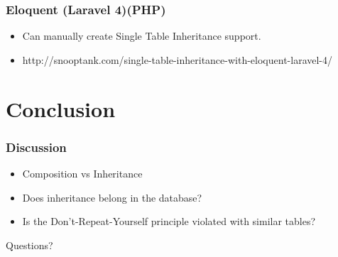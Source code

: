 \documentclass{beamer}
\begin{document}
\begin{frame}
	\frametitle{Eloquent (Laravel 4)(PHP)}
	
	\begin{itemize}
		\item Can manually create Single Table Inheritance support.
		\item http://snooptank.com/single-table-inheritance-with-eloquent-laravel-4/
	\end{itemize}
\end{frame}

\section{Conclusion}

\begin{frame}
	\frametitle{Discussion}
	
	\begin{itemize}
		\item Composition vs Inheritance
		\item Does inheritance belong in the database?
		\item Is the Don't-Repeat-Yourself principle violated with similar tables?
	\end{itemize}

\end{frame}

\begin{frame}
	\Huge{\centerline{Questions?}}
\end{frame}
\end{document}
